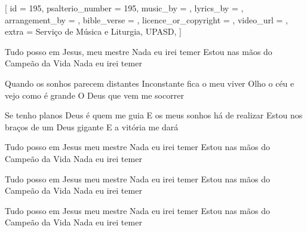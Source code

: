 [
    id                     = {195},
    psalterio_number       = {195},
    music_by               = {},
    lyrics_by              = {},
    arrangement_by         = {},
    bible_verse            = {},
    licence_or_copyright   = {},
    video_url              = {},
    extra                  = {Serviço de Música e Liturgia, UPASD},
]


\beginchorus
Tudo posso em Jesus, meu mestre
Nada eu irei temer
Estou nas mãos do Campeão da Vida
Nada eu irei temer
\endchorus


\beginverse
Quando os sonhos parecem distantes
Inconstante fica o meu viver
Olho o céu e vejo como é grande
O Deus que vem me socorrer
\endverse


\beginverse
Se tenho planos Deus é quem me guia
E os meus sonhos há de realizar
Estou nos braços de um Deus gigante
E a vitória me dará
\endverse


\beginchorus
Tudo posso em Jesus meu mestre
Nada eu irei temer
Estou nas mãos do Campeão da Vida
Nada eu irei temer
\endchorus


\beginchorus
Tudo posso em Jesus meu mestre
Nada eu irei temer
Estou nas mãos do Campeão da Vida
Nada eu irei temer
\endchorus


\beginchorus
Tudo posso em Jesus meu mestre
Nada eu irei temer
Estou nas mãos do Campeão da Vida
Nada eu irei temer
\endchorus

\endsong
